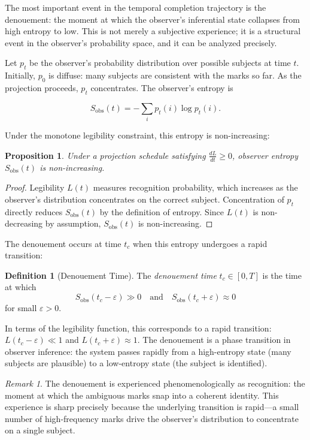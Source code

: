 \documentclass[12pt, twoside]{article}
\theoremstyle{plain}
\newtheorem{proposition}[theorem]{Proposition}
\theoremstyle{definition}
\newtheorem{definition}[theorem]{Definition}
\theoremstyle{remark}
\newtheorem{remark}[theorem]{Remark}
\begin{document}
The most important event in the temporal completion trajectory is the denouement: the moment at which the observer's inferential state collapses from high entropy to low. This is not merely a subjective experience; it is a structural event in the observer's probability space, and it can be analyzed precisely.

Let $p_t$ be the observer's probability distribution over possible subjects at time $t$. Initially, $p_0$ is diffuse: many subjects are consistent with the marks so far. As the projection proceeds, $p_t$ concentrates. The observer's entropy is

\[
S_{\text{obs}}(t) = -\sum_i p_t(i) \log p_t(i).
\]

Under the monotone legibility constraint, this entropy is non-increasing:

\begin{proposition}
\label{prop:observer-entropy}
Under a projection schedule satisfying $\frac{dL}{dt} \geq 0$, observer entropy $S_{\text{obs}}(t)$ is non-increasing.
\end{proposition}

\begin{proof}
Legibility $L(t)$ measures recognition probability, which increases as the observer's distribution concentrates on the correct subject. Concentration of $p_t$ directly reduces $S_{\text{obs}}(t)$ by the definition of entropy. Since $L(t)$ is non-decreasing by assumption, $S_{\text{obs}}(t)$ is non-increasing.
\end{proof}

The denouement occurs at time $t_c$ when this entropy undergoes a rapid transition:

\begin{definition}[Denouement Time]
The \emph{denouement time} $t_c \in [0, T]$ is the time at which
\[
S_{\text{obs}}(t_c - \varepsilon) \gg 0 \quad \text{and} \quad S_{\text{obs}}(t_c + \varepsilon) \approx 0
\]
for small $\varepsilon > 0$.
\end{definition}

In terms of the legibility function, this corresponds to a rapid transition: $L(t_c - \varepsilon) \ll 1$ and $L(t_c + \varepsilon) \approx 1$. The denouement is a phase transition in observer inference: the system passes rapidly from a high-entropy state (many subjects are plausible) to a low-entropy state (the subject is identified).

\begin{remark}
The denouement is experienced phenomenologically as recognition: the moment at which the ambiguous marks snap into a coherent identity. This experience is sharp precisely because the underlying transition is rapid---a small number of high-frequency marks drive the observer's distribution to concentrate on a single subject.
\end{remark}
\end{document}
